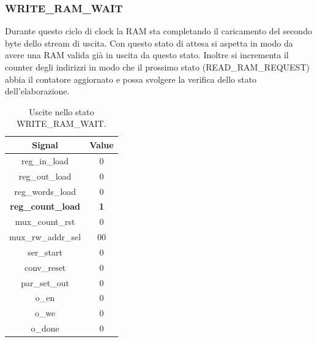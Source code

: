 \documentclass[a4paper]{report}
\begin{document}
\subsubsection{WRITE\_RAM\_WAIT}
Durante questo ciclo di clock la RAM sta completando il caricamento del secondo byte dello stream di uscita. Con questo stato di attesa si aspetta in modo da avere una RAM valida già in uscita da questo stato. Inoltre si incrementa il counter degli indirizzi in modo che il prossimo stato (READ\_RAM\_REQUEST) abbia il contatore aggiornato e possa svolgere la verifica dello stato dell'elaborazione.
\begin{table}[H]
  \centering
  \begin{tabular}{||c | c||} 
    \hline
    Signal & Value \\
    \hline\hline
    reg\_in\_load & 0 \\
    reg\_out\_load & 0 \\
    reg\_words\_load & 0 \\
    \textbf{reg\_count\_load} & \textbf{1} \\
    mux\_count\_rst & 0 \\
    mux\_rw\_addr\_sel & 00 \\
    ser\_start & 0 \\
    conv\_reset & 0 \\
    par\_set\_out & 0 \\
    o\_en & 0 \\
    o\_we & 0 \\
    o\_done & 0 \\
   \hline
  \end{tabular}
  \caption{Uscite nello stato WRITE\_RAM\_WAIT.}
  \label{table:10}
\end{table}
\end{document}
